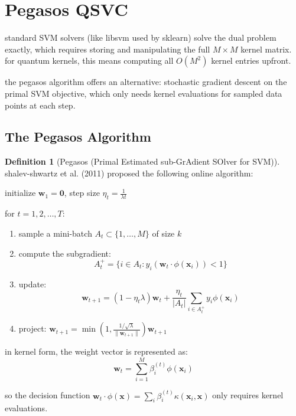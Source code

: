 \documentclass[11pt,a4paper]{article}
\theoremstyle{definition}
\newtheorem{definition}{Definition}[section]
\theoremstyle{remark}
\begin{document}
\section{Pegasos QSVC}

standard SVM solvers (like libsvm used by sklearn) solve the dual problem exactly, which requires storing and manipulating the full $M \times M$ kernel matrix. for quantum kernels, this means computing all $O(M^2)$ kernel entries upfront.

the pegasos algorithm offers an alternative: stochastic gradient descent on the primal SVM objective, which only needs kernel evaluations for sampled data points at each step.

\subsection{The Pegasos Algorithm}

\begin{definition}[Pegasos (Primal Estimated sub-GrAdient SOlver for SVM)]
shalev-shwartz et al. (2011) proposed the following online algorithm:

initialize $\mathbf{w}_1 = \mathbf{0}$, step size $\eta_t = \frac{1}{\lambda t}$

for $t = 1, 2, \ldots, T$:
\begin{enumerate}[leftmargin=*]
    \item sample a mini-batch $A_t \subset \{1, \ldots, M\}$ of size $k$
    \item compute the subgradient:
    \[
    A_t^+ = \{i \in A_t : y_i (\mathbf{w}_t \cdot \phi(\mathbf{x}_i)) < 1\}
    \]
    \item update:
    \[
    \mathbf{w}_{t+1} = (1 - \eta_t \lambda) \mathbf{w}_t + \frac{\eta_t}{|A_t|} \sum_{i \in A_t^+} y_i \phi(\mathbf{x}_i)
    \]
    \item project: $\mathbf{w}_{t+1} = \min\!\left(1, \frac{1/\sqrt{\lambda}}{\|\mathbf{w}_{t+1}\|}\right) \mathbf{w}_{t+1}$
\end{enumerate}
\end{definition}

in kernel form, the weight vector is represented as:
\[
\mathbf{w}_t = \sum_{i=1}^M \beta_i^{(t)} \phi(\mathbf{x}_i)
\]

so the decision function $\mathbf{w}_t \cdot \phi(\mathbf{x}) = \sum_i \beta_i^{(t)} \kappa(\mathbf{x}_i, \mathbf{x})$ only requires kernel evaluations.
\end{document}
